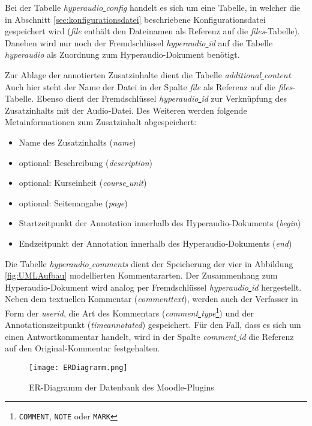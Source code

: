 Bei der Tabelle \textit{hyperaudio\underline{{ }}config} handelt es sich um eine Tabelle, in welcher die in Abschnitt \ref{sec:konfigurationsdatei} beschriebene Konfigurationsdatei gespeichert wird (\textit{file} enthält den Dateinamen als Referenz auf die \textit{files}-Tabelle). Daneben wird nur noch der Fremdschlüssel \textit{hyperaudio\underline{{ }}id} auf die Tabelle \textit{hyperaudio} als Zuordnung zum Hyperaudio-Dokument benötigt.

Zur Ablage der annotierten Zusatzinhalte dient die Tabelle \textit{additional\underline{{ }}content}. Auch hier steht der Name der Datei in der Spalte \textit{file} als Referenz auf die \textit{files}-Tabelle. Ebenso dient der Fremdschlüssel \textit{hyperaudio\underline{{ }}id} zur Verknüpfung des Zusatzinhalts mit der Audio-Datei. Des Weiteren werden folgende Metainformationen zum Zusatzinhalt abgespeichert:

\begin{itemize}

\item Name des Zusatzinhalts (\textit{name})
\item optional: Beschreibung (\textit{description})
\item optional: Kurseinheit (\textit{course\underline{{ }}unit})
\item optional: Seitenangabe (\textit{page})
\item Startzeitpunkt der Annotation innerhalb des Hyperaudio-Dokuments (\textit{begin})
\item Endzeitpunkt der Annotation innerhalb des Hyperaudio-Dokuments (\textit{end})

\end{itemize}

Die Tabelle \textit{hyperaudio\underline{{ }}comments} dient der Speicherung der vier in Abbildung \ref{fig:UMLAufbau} modellierten Kommentararten. Der Zusammenhang zum Hyperaudio-Dokument wird analog per Fremdschlüssel \textit{hyperaudio\underline{{ }}id} hergestellt. Neben dem textuellen Kommentar (\textit{commenttext}), werden auch der Verfasser in Form der \textit{userid}, die Art des Kommentars (\textit{comment\underline{{ }}type}\footnote{\texttt{COMMENT}, \texttt{NOTE} oder \texttt{MARK}}) und der Annotationszeitpunkt (\textit{timeannotated}) gespeichert. Für den Fall, dass es sich um einen Antwortkommentar handelt, wird in der Spalte \textit{comment\underline{{ }}id} die Referenz auf den Original-Kommentar festgehalten.

\begin{figure}[h!]
\texttt{[image: ERDiagramm.png]}
\caption{\label{fig:ERDiagramm}ER-Diagramm der Datenbank des Moodle-Plugins}
\end{figure}


